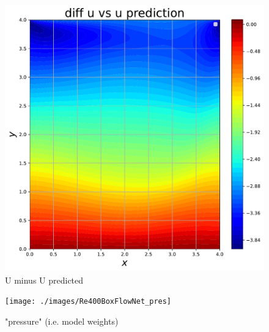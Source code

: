 \documentclass{article}
\begin{document}
\begin{figure}[htb!]
	\includegraphics[width=\linewidth]{./images/Re400BoxFlowNet_diff_u}
	\caption{U minus U predicted}
	\label{fig:u_diff}\hfill

	\endminipage
\end{figure}

\begin{figure}[htb!]
	\centering
	\texttt{[image: ./images/Re400BoxFlowNet\_pres]}
	\caption{"pressure" (i.e. model weights)}\label{fig:pred_pres}
	\label{fig:SIMPLE_pres2}
\end{figure}
\end{document}
